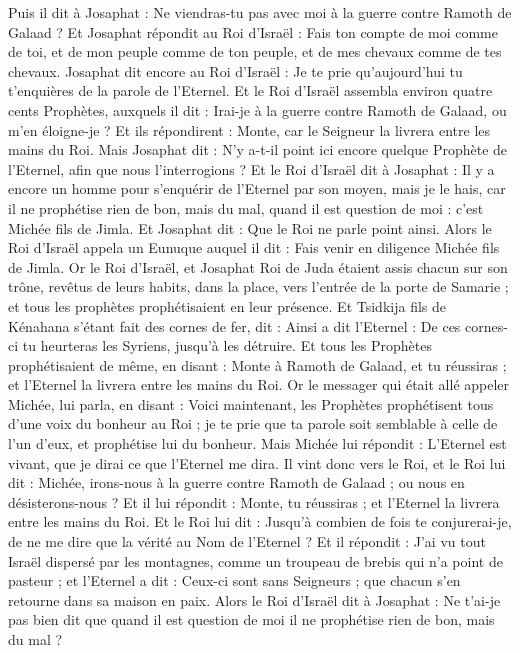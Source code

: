 \begin{multicols}{2}
Puis il dit à Josaphat : Ne viendras-tu pas avec moi à la guerre contre Ramoth de Galaad ? Et Josaphat répondit au Roi d'Israël : Fais ton compte de moi comme de toi, et de mon peuple comme de ton peuple, et de mes chevaux comme de tes chevaux.
Josaphat dit encore au Roi d'Israël : Je te prie qu'aujourd'hui tu t'enquières de la parole de l'Eternel.
Et le Roi d'Israël assembla environ quatre cents Prophètes, auxquels il dit : Irai-je à la guerre contre Ramoth de Galaad, ou m'en éloigne-je ? Et ils répondirent : Monte, car le Seigneur la livrera entre les mains du Roi.
Mais Josaphat dit : N'y a-t-il point ici encore quelque Prophète de l'Eternel, afin que nous l'interrogions ?
Et le Roi d'Israël dit à Josaphat : Il y a encore un homme pour s'enquérir de l'Eternel par son moyen, mais je le hais, car il ne prophétise rien de bon, mais du mal, quand il est question de moi : c'est Michée fils de Jimla. Et Josaphat dit : Que le Roi ne parle point ainsi.
Alors le Roi d'Israël appela un Eunuque auquel il dit : Fais venir en diligence Michée fils de Jimla.
Or le Roi d'Israël, et Josaphat Roi de Juda étaient assis chacun sur son trône, revêtus de leurs habits, dans la place, vers l'entrée de la porte de Samarie ; et tous les prophètes prophétisaient en leur présence.
Et Tsidkija fils de Kénahana s'étant fait des cornes de fer, dit : Ainsi a dit l'Eternel : De ces cornes-ci tu heurteras les Syriens, jusqu'à les détruire.
Et tous les Prophètes prophétisaient de même, en disant : Monte à Ramoth de Galaad, et tu réussiras ; et l'Eternel la livrera entre les mains du Roi.
Or le messager qui était allé appeler Michée, lui parla, en disant : Voici maintenant, les Prophètes prophétisent tous d'une voix du bonheur au Roi ; je te prie que ta parole soit semblable à celle de l'un d'eux, et prophétise lui du bonheur.
Mais Michée lui répondit : L'Eternel est vivant, que je dirai ce que l'Eternel me dira.
Il vint donc vers le Roi, et le Roi lui dit : Michée, irons-nous à la guerre contre Ramoth de Galaad ; ou nous en désisterons-nous ? Et il lui répondit : Monte, tu réussiras ; et l'Eternel la livrera entre les mains du Roi.
Et le Roi lui dit : Jusqu'à combien de fois te conjurerai-je, de ne me dire que la vérité au Nom de l'Eternel ?
Et il répondit : J'ai vu tout Israël dispersé par les montagnes, comme un troupeau de brebis qui n'a point de pasteur ; et l'Eternel a dit : Ceux-ci sont sans Seigneurs ; que chacun s'en retourne dans sa maison en paix.
Alors le Roi d'Israël dit à Josaphat : Ne t'ai-je pas bien dit que quand il est question de moi il ne prophétise rien de bon, mais du mal ?

\end{multicols}
